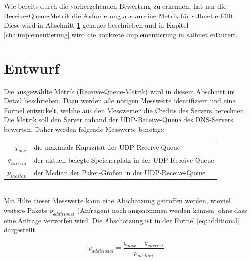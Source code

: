 \documentclass[a4paper, 12pt, BCOR10mm, DIV12, toc=bibliography, toc=listof, german]{scrbook}
\begin{document}

		Wie bereits durch die vorhergehenden Bewertung zu erkennen, hat nur die Receive-Queue-Metrik die
		Anforderung aus \cite{scsczile2008} an eine Metrik für salbnet erfüllt. Diese wird in Abschnitt
		\ref{sec:entwurf} genauer beschrieben und in Kapitel \ref{cha:implementierung} wird die
		konkrete Implementierung in salbnet erläutert.


		\section{Entwurf} %
		\label{sec:entwurf}

		Die ausgewählte Metrik (Receive-Queue-Metrik) wird in diesem Abschnitt im Detail beschrieben.
		Dazu werden alle nötigen Messwerte identifiziert und eine Formel entwickelt, welche aus den
		Messwerten die Credits des Servers berechnen. Die Metrik soll den Server anhand der
		UDP-Receive-Queue des DNS-Servers bewerten. Daher werden folgende Messwerte benötigt: $~$\\
		
		\begin{tabular}{rl}
			$q_{max}$		  & die maximale Kapazität der UDP-Receive-Queue\\
			$q_{current}$ &	der aktuell belegte Speicherplatz in der UDP-Receive-Queue\\
			$p_{median}$  &	der Median der Paket-Größen in der UDP-Receive-Queue\\
		\end{tabular}
		
		$~$\\
		Mit Hilfe dieser Messwerte kann eine Abschätzung getroffen werden, wieviel weitere Pakete
		$p_{additional}$ (Anfragen) noch angenommen werden können, ohne dass eine Anfrage verworfen wird.
		Die Abschätzung ist in der Formel \ref{eq:additional} dargestellt. 

		\begin{equation}
			p_{additional} = \frac{q_{max} - q_{current}}{p_{median}}
			\label{eq:additional}
		\end{equation}
\end{document}
